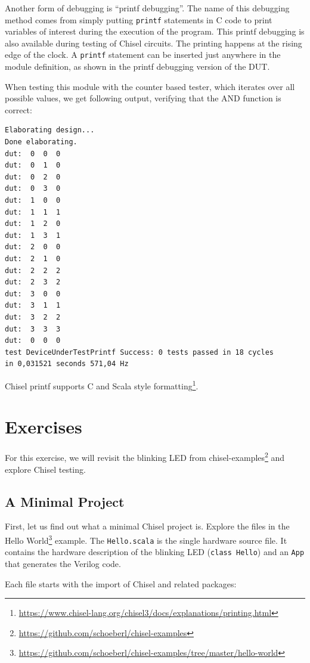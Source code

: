 \documentclass[%
    10pt,
    headinclude, footexclude,
    openright, %
    notitlepage,
    cleardoubleempty,
    headsepline,
    pointlessnumbers,
    bibtotoc, idxtotoc,
    ]{scrbook}
\newcommand{\code}[1]{{\lstinline[basicstyle=\small\ttfamily]{#1}}}
\newcommand{\myref}[2]{\href{#1}{#2}}
\renewcommand{\myref}[2]{{#2}{\footnote{\url{#1}}}}
\begin{document}
Another form of debugging is ``printf debugging''. The name of this debugging method comes from
simply putting \code{printf} statements in C code to print variables of interest during
the execution of the program. This printf debugging is also available during testing
of Chisel circuits. The printing happens at the rising edge of the clock.
A \code{printf} statement can be inserted just anywhere in the module definition,
as shown in the printf debugging version of the DUT.


\noindent When testing this module with the counter based tester, which iterates over all possible
values, we get following output, verifying that the AND function is correct:

\begin{verbatim}
Elaborating design...
Done elaborating.
dut:  0  0  0
dut:  0  1  0
dut:  0  2  0
dut:  0  3  0
dut:  1  0  0
dut:  1  1  1
dut:  1  2  0
dut:  1  3  1
dut:  2  0  0
dut:  2  1  0
dut:  2  2  2
dut:  2  3  2
dut:  3  0  0
dut:  3  1  1
dut:  3  2  2
dut:  3  3  3
dut:  0  0  0
test DeviceUnderTestPrintf Success: 0 tests passed in 18 cycles
in 0,031521 seconds 571,04 Hz
\end{verbatim}

Chisel printf supports
\myref{https://www.chisel-lang.org/chisel3/docs/explanations/printing.html}{C and Scala style formatting}.


\section{Exercises}

For this exercise, we will revisit the blinking LED from
\myref{https://github.com/schoeberl/chisel-examples}{chisel-examples}
and explore Chisel testing.

\subsection{A Minimal Project}

First, let us find out what a minimal Chisel project is. Explore the files in the
\myref{https://github.com/schoeberl/chisel-examples/tree/master/hello-world}{Hello World}
example.
The \code{Hello.scala} is the single hardware source file.
It contains the hardware description of the blinking LED (\code{class Hello})
and an \code{App} that generates the Verilog code.

Each file starts with the import of Chisel and related packages:
\end{document}

